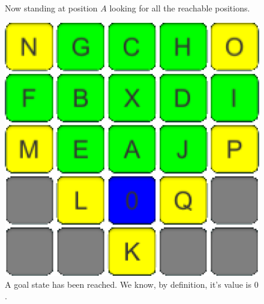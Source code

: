 \documentclass[conference]{IEEEtran}
\begin{document}
\begin{figure}[h]
\begin{minipage}[t]{0.3\linewidth}
\caption{Now standing at position $A$ looking for all the reachable positions.}
\end{minipage}
\hfill
\begin{minipage}[t]{0.3\linewidth}
\centering
\includegraphics[width=1\textwidth]{images/ValueFunction/03.png}
\caption{A goal state has been reached. We know, by definition, it's value is $0$.}
\end{minipage}
\end{figure}
\end{document}
